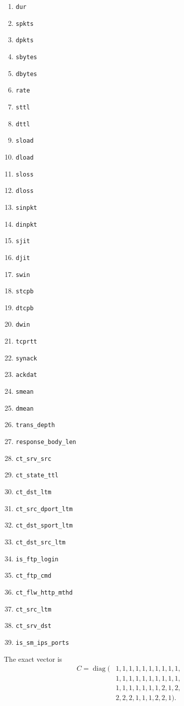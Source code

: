 \documentclass[conference]{IEEEtran}
\begin{document}
\begin{enumerate}
\setlength{\itemsep}{0pt}\setlength{\parskip}{0pt}
\item \texttt{dur}\item \texttt{spkts}\item \texttt{dpkts}\item \texttt{sbytes}\item \texttt{dbytes}\item \texttt{rate}\item \texttt{sttl}\item \texttt{dttl}\item \texttt{sload}\item \texttt{dload}\item \texttt{sloss}\item \texttt{dloss}\item \texttt{sinpkt}\item \texttt{dinpkt}\item \texttt{sjit}\item \texttt{djit}\item \texttt{swin}\item \texttt{stcpb}\item \texttt{dtcpb}\item \texttt{dwin}\item \texttt{tcprtt}\item \texttt{synack}\item \texttt{ackdat}\item \texttt{smean}\item \texttt{dmean}\item \texttt{trans\_depth}\item \texttt{response\_body\_len}\item \texttt{ct\_srv\_src}\item \texttt{ct\_state\_ttl}\item \texttt{ct\_dst\_ltm}\item \texttt{ct\_src\_dport\_ltm}\item \texttt{ct\_dst\_sport\_ltm}\item \texttt{ct\_dst\_src\_ltm}\item \texttt{is\_ftp\_login}\item \texttt{ct\_ftp\_cmd}\item \texttt{ct\_flw\_http\_mthd}\item \texttt{ct\_src\_ltm}\item \texttt{ct\_srv\_dst}\item \texttt{is\_sm\_ips\_ports}
\end{enumerate}
The exact vector is
\begin{equation*}
\begin{split}
C=\operatorname{diag}(&1,1,1,1,1,1,1,1,1,1,\\
&1,1,1,1,1,1,1,1,1,1,\\
&1,1,1,1,1,1,1,2,1,2,\\
&2,2,2,1,1,1,2,2,1).
\end{split}
\end{equation*}
\end{document}
